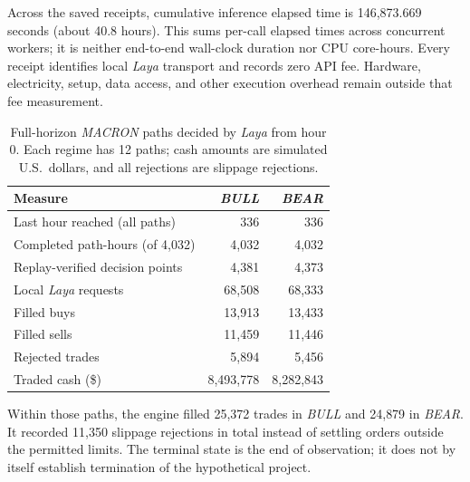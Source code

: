 Across the saved receipts, cumulative inference elapsed time is
146{,}873.669 seconds (about 40.8 hours). This sums per-call elapsed times
across concurrent workers; it is neither end-to-end wall-clock duration nor
CPU core-hours. Every receipt identifies local \textit{Laya} transport and
records zero API fee. Hardware, electricity, setup, data access, and other
execution overhead remain outside that fee measurement.

\begin{table}[t]
\caption{Full-horizon \textit{MACRON} paths decided by \textit{Laya} from
hour 0. Each regime has 12 paths; cash amounts are simulated U.S.\ dollars, and
all rejections are slippage rejections.}
\label{tab:macron-laya}
\centering\footnotesize
\renewcommand{\arraystretch}{1.1}
\begin{tabular}{@{}lrr@{}}
\toprule
Measure & \textit{BULL} & \textit{BEAR} \\
\midrule
Last hour reached (all paths) & 336 & 336 \\
Completed path-hours (of 4{,}032) & 4{,}032 & 4{,}032 \\
Replay-verified decision points & 4{,}381 & 4{,}373 \\
Local \textit{Laya} requests & 68{,}508 & 68{,}333 \\
Filled buys & 13{,}913 & 13{,}433 \\
Filled sells & 11{,}459 & 11{,}446 \\
Rejected trades & 5{,}894 & 5{,}456 \\
Traded cash (\$) & 8{,}493{,}778 & 8{,}282{,}843 \\
\bottomrule
\end{tabular}
\end{table}
Within those paths, the engine filled 25{,}372 trades in \textit{BULL} and
24{,}879 in \textit{BEAR}. It recorded 11{,}350 slippage rejections in total
instead of settling orders outside the permitted limits. The terminal state
is the end of observation; it does not by itself establish termination of the
hypothetical project.

